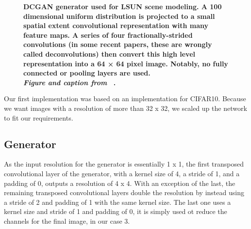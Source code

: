         \begin{figure}[h]
            \centering
            \caption[DCGAN generator for LSUN]
            {
                \textbf{DCGAN generator used for LSUN scene modeling. A 100 dimensional uniform distribution  is projected to a small spatial extent convolutional representation with many feature maps. A series of four fractionally-strided convolutions (in some recent papers, these are wrongly called deconvolutions) then convert this high level representation into a 64 × 64 pixel image. Notably, no fully connected or pooling layers are used.\\
                \textit{Figure and caption from} ~\cite{dcgan}.}
            }
            \label{fig:architecture_dcgan}
        \end{figure}

        Our first implementation was based on an implementation for CIFAR10. Because we want images with a resolution of more than 32 x 32, we scaled up the network to fit our requirements.

        \subsection{Generator}
            As the input resolution for the generator is essentially 1 x 1, the first transposed convolutional layer of the generator, with a kernel size of 4, a stride of 1, and a padding of 0, outputs a resolution of 4 x 4. With an exception of the last, the remaining transposed convolutional layers double the resolution by instead using a stride of 2 and padding of 1 with the same kernel size. The last one uses a kernel size and stride of 1 and padding of 0, it is simply used ot reduce the channels for the final image, in our case 3.
            

